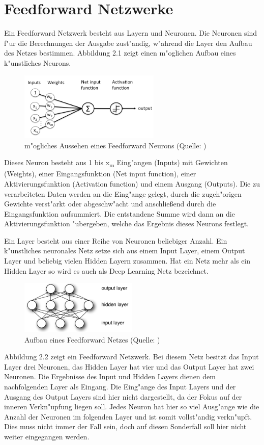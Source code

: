 {\section{Feedforward Netzwerke}
Ein Feedforward Netzwerk besteht aus Layern und Neuronen. Die Neuronen sind f"ur die Berechnungen der Ausgabe zust"andig, w"ahrend die Layer den Aufbau des Netzes bestimmen. Abbildung 2.1 zeigt einen m"oglichen Aufbau eines k"unstliches Neurons.
\renewcommand{\figurename}{Abb.}
\begin{figure}[htp]
\centering
\includegraphics[width=0.60\textwidth]{pictures/perceptron_node.png}
\caption[Feedforward Neuron]{m"ogliches Aussehen eines Feedforward Neurons (Quelle: \cite{DL4Jimg1})}
\end{figure}
Dieses Neuron besteht aus 1 bis x\textsubscript{m} Eing"angen (Inputs) mit Gewichten (Weights), einer Eingangsfunktion (Net input function), einer Aktivierungsfunktion (Activation function) und einem Ausgang (Outputs). Die zu verarbeiteten Daten werden an die Eing"ange gelegt, durch die zugeh"origen Gewichte verst"arkt oder abgeschw"acht und anschlie{\ss}end durch die Eingangsfunktion aufsummiert. Die entstandene Summe wird dann an die Aktivierungsfunktion "ubergeben, welche das Ergebnis dieses Neurons festlegt.

Ein Layer besteht aus einer Reihe von Neuronen beliebiger Anzahl. Ein k"unstliches neuronales Netz setze sich aus einem Input Layer, einem Output Layer und beliebig vielen Hidden Layern zusammen. Hat ein Netz mehr als ein Hidden Layer so wird es auch als Deep Learning Netz bezeichnet.
\renewcommand{\figurename}{Abb.}
\begin{figure}[htp]
\centering
\includegraphics[width=0.50\textwidth]{pictures/mlp.png}
\caption[Aufbau eines Feedforward Netzes]{Aufbau eines Feedforward Netzes (Quelle: \cite{DL4Jimg1})} 
\end{figure}
Abbildung 2.2 zeigt ein Feedforward Netzwerk. Bei diesem Netz besitzt das Input Layer drei Neuronen, das Hidden Layer hat vier und das Output Layer hat zwei Neuronen. Die Ergebnisse des Input und Hidden Layers dienen dem nachfolgenden Layer als Eingang. Die Eing"ange des Input Layers und der Ausgang des Output Layers sind hier nicht dargestellt, da der Fokus auf der inneren Verkn"upfung liegen soll. Jedes Neuron hat hier so viel Ausg"ange wie die Anzahl der Neuronen im folgenden Layer und ist somit vollst"andig verkn"upft. Dies muss nicht immer der Fall sein, doch auf diesen Sonderfall soll hier nicht weiter eingegangen werden.


}

